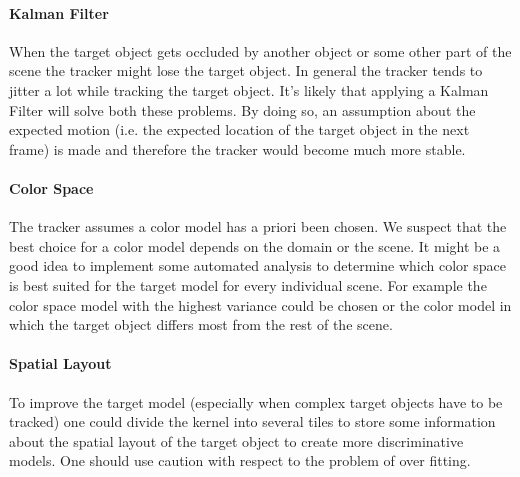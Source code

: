 \documentclass[11pt]{article}
\begin{document}
\paragraph{Kalman Filter} When the target object gets occluded by another object
or some other part of the scene the tracker might lose the target object. In
general the tracker tends to jitter a lot while tracking the target object.
It's likely that applying a Kalman Filter will solve both these problems. By
doing so, an assumption about the expected motion (i.e. the expected location
of the target object in the next frame) is made and therefore the tracker would
become much more stable.

\paragraph{Color Space} The tracker assumes a color model has a priori been
chosen. We suspect that the best choice for a color model depends on the domain
or the scene. It might be a good idea to implement some automated analysis to
determine which color space is best suited for the target model for every
individual scene. For example the color space model with the highest variance
could be chosen or the color model in which the target object differs most from
the rest of the scene.

\paragraph{Spatial Layout} To improve the target model (especially when complex
target objects have to be tracked) one could divide the kernel into several
tiles to store some information about the spatial layout of the target object
to create more discriminative models. One should use caution with respect to
the problem of over fitting.

\renewcommand\bibname{References}


\end{document}

